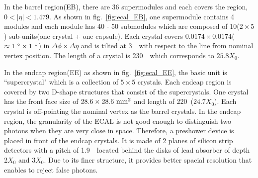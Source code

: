 In the barrel region(EB), there are 36 supermodules and each covers 
the region, $0 < |\eta| < 1.479$. 
As shown in fig.~\ref{fig:ecal_EB}, one supermodule contains 4 modules 
and each module has 40 - 50 submodules 
which are composed of 10($2 \times 5$) sub-units(one crystal + one capsule). 
Each crystal covers $0.0174 \times 0.0174$($\approx 1~^\circ \times 1~^\circ$)
in $\Delta \phi \times \Delta \eta$ and is tilted at 3~\dg\ with respect to the line 
from nominal vertex position. %
The length of a crystal is 230~\mm\ which corresponds to $25.8X_0$.

In the endcap region(EE) as shown in fig.~\ref{fig:ecal_EE}, 
the basic unit is ``supercrystal" which is a collection of $5 \times 5$ crystals. 
Each endcap region is covered by two D-shape structures that consist of 
the supercrystals. One crystal has the front face size of $28.6 \times 28.6~\mathrm{mm}^2$ 
and length of 220~\mm($24.7X_0$).
Each crystal is off-pointing the nominal vertex as the barrel crystals.  
In the endcap region, the granularity of the ECAL is not good enough 
to distinguish two photons when they are very close in space.  
Therefore, a preshower device is placed in front of the endcap crystals. 
It is made of 2 planes of silicon strip detectors with a pitch of 1.9~\mm\ 
located behind the disks of lead absorber of depth 2$X_0$ and 3$X_0$.
Due to its finer structure, it provides better spacial resolution 
that enables to reject false photons.  


